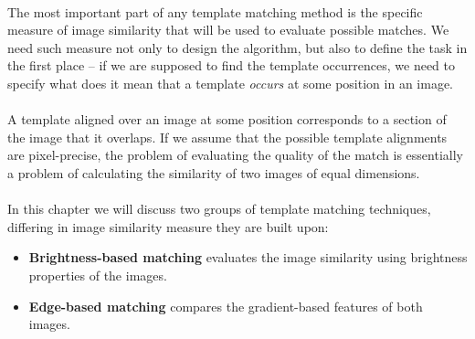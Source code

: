 \paragraph*{}
The most important part of any template matching method is the specific measure of image similarity that will be used to evaluate possible matches. We need such measure not only to design the algorithm, but also to define the task in the first place -- if we are supposed to find the template occurrences, we need to specify what does it mean that a template \textit{occurs} at some position in an image. 

\paragraph*{}
A template aligned over an image at some position corresponds to a section of the image that it overlaps. If we assume that the possible template alignments are pixel-precise, the problem of evaluating the quality of the match is essentially a problem of calculating the similarity of two images of equal dimensions.

\paragraph*{}
In this chapter we will discuss two groups of template matching techniques, differing in image similarity measure they are built upon:

\begin{itemize}
	\item \textbf{Brightness-based matching} evaluates the image similarity using brightness properties of the images.
	\item \textbf{Edge-based matching} compares the gradient-based features of both images.
\end{itemize}
